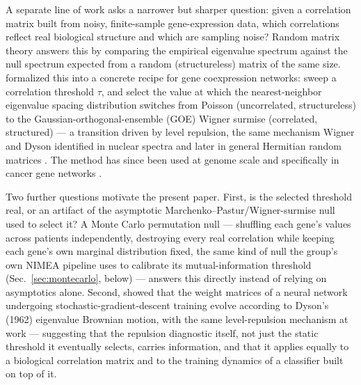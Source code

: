 \documentclass[11pt]{article}
\begin{document}
A separate line of work asks a narrower but sharper question: given a
correlation matrix built from noisy, finite-sample gene-expression
data, which correlations reflect real biological structure and which
are sampling noise? Random matrix theory answers this by comparing the
empirical eigenvalue spectrum against the null spectrum expected from a
random (structureless) matrix of the same size. \citet{luo2007}
formalized this into a concrete recipe for gene coexpression networks:
sweep a correlation threshold $\tau$, and select the value at which the
nearest-neighbor eigenvalue spacing distribution switches from Poisson
(uncorrelated, structureless) to the Gaussian-orthogonal-ensemble (GOE)
Wigner surmise (correlated, structured) --- a transition driven by
level repulsion, the same mechanism Wigner and Dyson identified in
nuclear spectra and later in general Hermitian random matrices
\citep{dyson1962}. The method has since been used at genome scale
\citep{gao2012} and specifically in cancer gene networks
\citep{cancer2018}.

Two further questions motivate the present paper. First, is the
selected threshold real, or an artifact of the asymptotic
Marchenko--Pastur/Wigner-surmise null used to select it? A Monte Carlo
permutation null --- shuffling each gene's values across patients
independently, destroying every real correlation while keeping each
gene's own marginal distribution fixed, the same kind of null the
group's own NIMEA pipeline uses to calibrate its mutual-information
threshold (Sec.~\ref{sec:montecarlo}, below) --- answers this directly
instead of relying on asymptotics alone. Second, \citet{aarts2024}
showed that the weight matrices of a neural network undergoing
stochastic-gradient-descent training evolve according to Dyson's
(1962) eigenvalue Brownian motion, with the same level-repulsion
mechanism at work --- suggesting that the repulsion diagnostic itself,
not just the static threshold it eventually selects, carries
information, and that it applies equally to a biological correlation
matrix and to the training dynamics of a classifier built on top of it.
\end{document}
